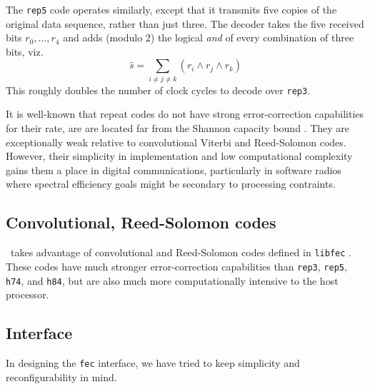 The {\tt rep5} code operates similarly, except that it transmits five copies
of the original data sequence, rather than just three.
The decoder takes the five received bits $r_0,\ldots,r_4$ and adds (modulo
2) the logical {\it and} of every combination of three bits, viz.
\[
    \hat{s} = \sum_{i\ne j \ne k} {(r_i \land r_j \land r_k)}
\]
This roughly doubles the number of clock cycles to decode over {\tt rep3}.

It is well-known that repeat codes do not have strong error-correction
capabilities for their rate, are are located far from the Shannon capacity
bound \cite{Proakis:2001}.
They are exceptionally weak relative to convolutional Viterbi and Reed-Solomon
codes.
However, their simplicity in implementation and low computational complexity
gains them a place in digital communications, particularly in software radios
where spectral efficiency goals might be secondary to processing contraints.

\subsection{Convolutional, Reed-Solomon codes}
\label{module:fec:conv}
\liquid\ takes advantage of convolutional and Reed-Solomon codes defined in
{\tt libfec} \cite{fec:web}.
These codes have much stronger error-correction capabilities than {\tt rep3},
{\tt rep5}, {\tt h74}, and {\tt h84}, but are also much more computationally
intensive to the host processor.

\subsection{Interface}
\label{module:fec:interface}
In designing the {\tt fec} interface, we have tried to keep simplicity and
reconfigurability in mind.

